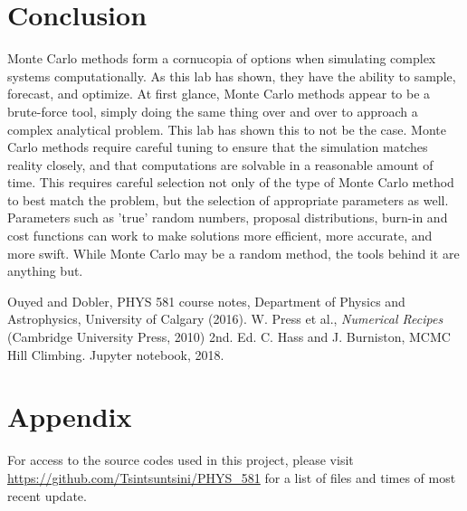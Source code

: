 \documentclass[twocolumn]{article}
\begin{document}
\section{Conclusion}
Monte Carlo methods form a cornucopia of options when simulating complex systems computationally. As this lab has shown, they have the ability to sample, forecast, and optimize. At first glance, Monte Carlo methods appear to be a brute-force tool, simply doing the same thing over and over to approach a complex analytical problem. This lab has shown this to not be the case. Monte Carlo methods require careful tuning to ensure that the simulation matches reality closely, and that computations are solvable in a reasonable amount of time. This requires careful selection not only of the type of Monte Carlo method to best match the problem, but the selection of appropriate parameters as well. Parameters such as 'true' random numbers, proposal distributions, burn-in and cost functions can work to make solutions more efficient, more accurate, and more swift. While Monte Carlo may be a random method, the tools behind it are anything but.


\begin{thebibliography}{00}
	Ouyed and Dobler, PHYS 581 course notes, Department of Physics and Astrophysics, University of Calgary (2016).
	W. Press et al., \emph{Numerical Recipes} (Cambridge University Press, 2010) 2nd. Ed.
	C. Hass and J. Burniston, MCMC Hill Climbing. Jupyter notebook, 2018.
\end{thebibliography}

\section{Appendix}
For access to the source codes used in this project, please visit \url{https://github.com/Tsintsuntsini/PHYS_581} for a list of files and times of most recent update.
	
\end{document}

